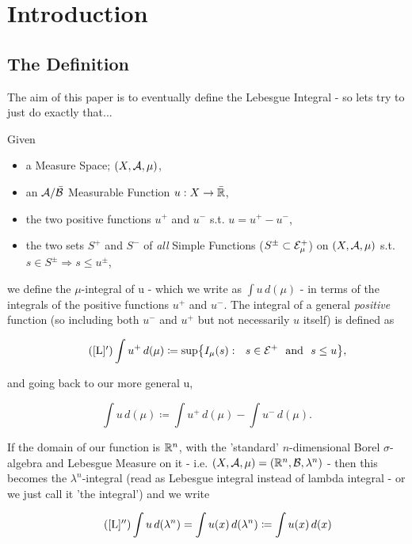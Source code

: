\section{Introduction} \label{intro}
\subsection{The Definition} \label{def}

The aim of this paper is to eventually define the Lebesgue Integral - so lets try to just do exactly that...
\begin{definition}
	Given
	\begin{itemize}
		\item a Measure Space; $(X, \mathcal{A}, \mu)$,
		\item an $\mathcal{A}/\bar {\mathcal{B}}$ Measurable Function $u : X \rightarrow \bar {\mathbb{R}}$,
		\item the two positive functions $u^+$ and $u^-$ s.t. $u = u^+ - u^-$,
		\item the two sets $S^+$ and $S^-$ of {\em all} Simple Functions ($S^{\pm} \subset \mathcal{E}_\mu^+$) on $(X, \mathcal{A}, \mu)$ s.t. $s \in S^{\pm} \Rightarrow s \leq u^{\pm}$,
	\end{itemize}

	we define the $\mu$-integral of u - which we write as $\int u\,d(\mu)$ - in terms of the integrals of the positive functions $u^+$ and 			$u^-$. The integral of a general {\em positive} function (so including both $u^-$ and $u^+$ but not necessarily $u$ itself) is defined as

	\begin{equation*}\label{posint}\tag{\ref{L}$'$}
	\int u^+\,d(\mu) \coloneqq \sup\bigr\{ I_\mu(s) : \ \  s \in \E^+ \hbox{ \ and \ } s \le u \bigl\},
	\end{equation*}

	and going back to our more general u, 

	\begin{equation}\label{L}
	\int u\,d(\mu) \coloneqq \int u^+\,d(\mu) - \int u^-\,d(\mu).
	\end{equation}

	If the domain of our function is $\mathbb{R}^n$, with the 'standard' $n$-dimensional Borel $\sigma$-algebra and Lebesgue Measure on it - i.e. $(X, \mathcal{A}, \mu) 	= (\mathbb{R}^n, \mathcal{B}, \lambda^n)$ - then this becomes the $\lambda^n$-integral (read as Lebesgue integral instead of lambda integral - or we just 			call it 'the integral') and we write

	\begin{equation*} \tag{\ref{L}$''$}
	\int u\,d(\lambda^n) =  \int u(x)\,d(\Ln) \coloneqq \int u(x)\,d(x) 
	\end{equation*}
\end{definition}

